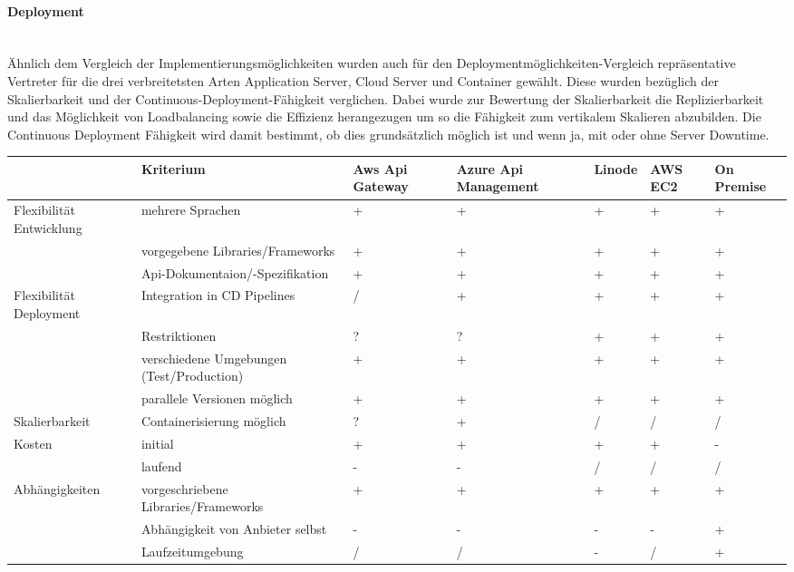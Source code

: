 \documentclass[notitlepage, hidelinks]{article}
\begin{document}
\paragraph{Deployment} \mbox{} \\
Ähnlich dem Vergleich der Implementierungsmöglichkeiten wurden auch für den Deploymentmöglichkeiten-Vergleich repräsentative Vertreter für die drei verbreitetsten Arten Application Server, Cloud Server und Container gewählt. Diese wurden bezüglich der Skalierbarkeit und der Continuous-Deployment-Fähigkeit verglichen. Dabei wurde zur Bewertung der Skalierbarkeit die Replizierbarkeit und das Möglichkeit von Loadbalancing sowie die Effizienz herangezugen um so die Fähigkeit zum vertikalem Skalieren abzubilden. Die Continuous Deployment Fähigkeit wird damit bestimmt, ob dies grundsätzlich möglich ist und wenn ja, mit oder ohne Server Downtime. \\

\begin{tabular}{|L{2cm}|L{3.2cm}|L{1.5cm}|L{1.5cm}|L{1.5cm}|L{1.5cm}|L{1.5cm}|}
\hline
& Kriterium & Aws Api Gateway & Azure Api Management & Linode & AWS EC2 & On Premise \\ \hline
Flexibilität Entwicklung & mehrere Sprachen & + & + & + & + & + \\ 
& vorgegebene Libraries/Frameworks & + & + & + & + & + \\ 
& Api-Dokumentaion/-Spezifikation & + & + & + & + & + \\ \hline
Flexibilität Deployment & Integration in CD Pipelines & / & + & + & + & + \\ 
& Restriktionen & ? & ? & + & + & + \\ 
& verschiedene Umgebungen (Test/Production) & + & + & + & + & + \\ 
& parallele Versionen möglich & + & + & + & + & + \\ \hline
Skalierbarkeit & Containerisierung möglich & ? & + & / & / & / \\ 
Kosten & initial & + & + & + & + & - \\ 
& laufend & - & - & / & / & / \\ \hline
Abhängigkeiten & vorgeschriebene Libraries/Frameworks & + & + & + & + & + \\ 
& Abhängigkeit von Anbieter selbst & - & - & - & - & + \\ 
& Laufzeitumgebung & / & / & - & / & + \\ \hline
\end{tabular}
\end{document}
